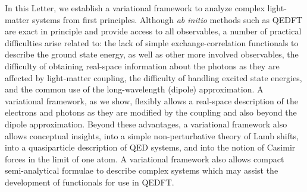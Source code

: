 \documentclass[aps,prl,twocolumn,
	groupedaddress,superscriptaddress,
	amsfonts,amssymb,amsmath,floatfix,
	citeautoscript]{revtex4-1}
\begin{document}
In this Letter, we establish a variational framework to analyze complex light-matter systems from first principles. Although  \textit{ab initio} methods such as QEDFT are exact in principle and provide access to all observables, a number of practical difficulties arise related to: the lack of simple exchange-correlation functionals to describe the ground state energy, as well as other more involved observables, the difficulty of obtaining real-space information about the photons as they are affected by light-matter coupling, the difficulty of handling excited state energies, and the common use of the long-wavelength (dipole) approximation. A variational framework, as we show, flexibly allows a real-space description of the electrons and photons as they are modified by the coupling and also beyond the dipole approximation. Beyond these advantages, a variational framework also allows conceptual insights, into a simple non-perturbative theory of Lamb shifts, into a quasiparticle description of QED systems, and into the notion of Casimir forces in the limit of one atom. A variational framework also allows compact semi-analytical formulae to describe complex systems which may assist the development of functionals for use in QEDFT. 
\end{document}
